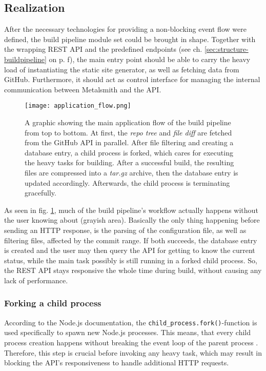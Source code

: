 \subsection{Realization}
After the necessary technologies for providing a non-blocking event flow were defined, the build pipeline module set could be brought in shape. Together with the wrapping REST API and the predefined endpoints (see ch. \ref{sec:structure-buildpipeline} on p. \pageref{sec:structure-buildpipeline}f), the main entry point should be able to carry the heavy load of instantiating the static site generator, as well as fetching data from GitHub. Furthermore, it should act as control interface for managing the internal communication between Metalsmith and the API.

\begin{figure} %
    \centering
    \texttt{[image: application\_flow.png]}
    \caption{A graphic showing the main application flow of the build pipeline from top to bottom. At first, the \emph{repo tree} and \emph{file diff} are fetched from the GitHub API in parallel. After file filtering and creating a database entry, a child process is forked, which cares for executing the heavy tasks for building. After a successful build, the resulting files are compressed into a \emph{tar.gz} archive, then the database entry is updated accordingly. Afterwards, the child process is terminating gracefully.}
    \label{fig:application-flow}
\end{figure}
%

As seen in fig. \ref{fig:application-flow}, much of the build pipeline's workflow actually happens without the user knowing about (grayish area). Basically the only thing happening before sending an HTTP response, is the parsing of the configuration file, as well as filtering files, affected by the commit range. If both succeeds, the database entry is created and the user may then query the API for getting to know the current status, while the main task possibly is still running in a forked child process. So, the REST API stays responsive the whole time during build, without causing any lack of performance.

\subsubsection{Forking a child process}
According to the Node.js documentation, the \texttt{child\_process.fork()}-function is used specifically to spawn new Node.js processes. This means, that every child process creation happens without breaking the event loop of the parent process \cite{NodejsChildProcesses}. Therefore, this step is crucial before invoking any heavy task, which may result in blocking the API's responsiveness to handle additional HTTP requests.

